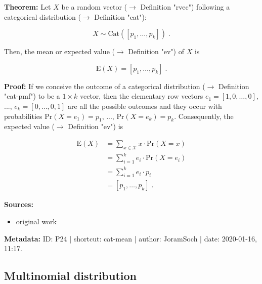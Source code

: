 \documentclass[a4paper,12pt]{book}
\begin{document}
\vspace{1em}
\textbf{Theorem:} Let $X$ be a random vector ($\rightarrow$ Definition "rvec") following a categorical distribution ($\rightarrow$ Definition "cat"):

\begin{equation} \label{eq:cat-mean-cat}
X \sim \mathrm{Cat}(\left[p_1, \ldots, p_k \right]) \; .
\end{equation}

Then, the mean or expected value ($\rightarrow$ Definition "ev") of $X$ is

\begin{equation} \label{eq:cat-mean-cat-mean}
\mathrm{E}(X) = \left[p_1, \ldots, p_k \right] \; .
\end{equation}


\vspace{1em}
\textbf{Proof:} If we conceive the outcome of a categorical distribution ($\rightarrow$ Definition "cat-pmf") to be a $1 \times k$ vector, then the elementary row vectors $e_1 = \left[1, 0, \ldots, 0 \right]$, ..., $e_k = \left[0, \ldots, 0, 1 \right]$ are all the possible outcomes and they occur with probabilities $\mathrm{Pr}(X = e_1) = p_1$, ..., $\mathrm{Pr}(X = e_k) = p_k$. Consequently, the expected value ($\rightarrow$ Definition "ev") is

\begin{equation} \label{eq:cat-mean-cat-mean-qed}
\begin{split}
\mathrm{E}(X) &= \sum_{x \in \mathcal{X}} x \cdot \mathrm{Pr}(X = x) \\
&= \sum_{i=1}^k e_i \cdot \mathrm{Pr}(X = e_i) \\
&= \sum_{i=1}^k e_i \cdot p_i \\
&= \left[p_1, \ldots, p_k \right] \; .
\end{split}
\end{equation}

\vspace{1em}
\textbf{Sources:}
\begin{itemize}
\item original work\end{itemize}


\vspace{1em}
\textbf{Metadata:} ID: P24 | shortcut: cat-mean | author: JoramSoch | date: 2020-01-16, 11:17.


\subsection{Multinomial distribution}
\end{document}
